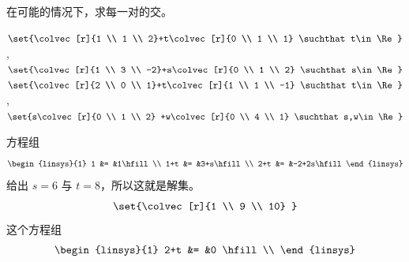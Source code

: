 \begin{exercises}
\begin{answer}
\begin{equation*}
      \end{equation*}    
    \end{answer}
  \recommended \item
    在可能的情况下，求每一对的交。
    \begin{exparts}
      \partsitem \( \set{\colvec[r]{1 \\ 1 \\ 2}+t\colvec[r]{0 \\ 1 \\ 1}
                     \suchthat t\in\Re} \),\,
            \( \set{\colvec[r]{1 \\ 3 \\ -2}+s\colvec[r]{0 \\ 1 \\ 2}
                     \suchthat s\in\Re} \)
      \partsitem \( \set{\colvec[r]{2 \\ 0 \\ 1}+t\colvec[r]{1 \\ 1 \\ -1}
                     \suchthat t\in\Re} \),\,
            \( \set{s\colvec[r]{0 \\ 1 \\ 2}
                     +w\colvec[r]{0 \\ 4 \\ 1}
                     \suchthat s,w\in\Re} \)
    \end{exparts}
    \begin{answer}
       \begin{exparts}
        \partsitem 方程组
          \begin{equation*}
            \begin{linsys}{1}
              1     &= &1\hfill         \\
              1+t   &= &3+s\hfill         \\
              2+t   &= &-2+2s\hfill
            \end{linsys}
          \end{equation*}
          给出 \( s=6 \) 与 \( t=8 \)，所以这就是解集。
          \begin{equation*}
            \set{\colvec[r]{1 \\ 9 \\ 10}     }
          \end{equation*}
        \partsitem 这个方程组
          \begin{equation*}
            \begin{linsys}{1}
            2+t   &=  &0 \hfill        \\

\end{linsys}
\end{equation*}
\end{exparts}
\end{answer}
\end{exercises}
